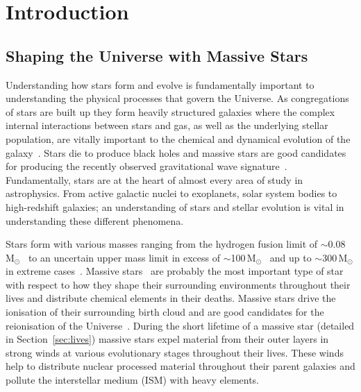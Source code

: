 \chapter{Introduction}\label{ch:intro}
\renewcommand{\headrulewidth}{1pt}

\section{Shaping the Universe with Massive Stars} %
\label{sec:massive_stars}
Understanding how stars form and evolve is fundamentally important to understanding the physical processes that govern the Universe.
As congregations of stars are built up they form heavily structured galaxies where the complex internal interactions between stars and gas, as well as the underlying stellar population, are vitally important to the chemical and dynamical evolution of the galaxy~\citep[e.g.][]{2014ARA&A..52..291C}.
Stars die to produce black holes and massive stars are good candidates for producing the recently observed gravitational wave signature~\citep{2016PhRvL.116f1102A,2016arXiv160204735L,2016arXiv160300511W}.
Fundamentally, stars are at the heart of almost every area of study in astrophysics.
From active galactic nuclei to exoplanets, solar system bodies to high-redshift galaxies; an understanding of stars and stellar evolution is vital in understanding these different phenomena.

Stars form with various masses ranging from the hydrogen fusion limit of $\sim$0.08\,M$_{\odot}$~\citep{1997ApJ...491..856B,2000ARA&A..38..337C} to an uncertain upper mass limit in excess of $\sim$100\,M$_{\odot}$~\citep[e.g.][]{2005Natur.434..192F,2012MNRAS.422..794E,2014A&A...568L..13W} and up to $\sim$300\,M$_{\odot}$ in extreme cases~\citep{2010MNRAS.408..731C}.
Massive stars~\citep[defined here as stars with initial masses $>$8\,M$_{\odot}$, e.g.][and expanded upon in Section~\ref{sec:lives}]{2014ARA&A..52..487S} are probably the most important type of star with respect to how they shape their surrounding environments throughout their lives and distribute chemical elements in their deaths.
Massive stars drive the ionisation of their surrounding birth cloud and are good candidates for the reionisation of the Universe~\citep[e.g.][]{1997ApJ...483...21H,2005SSRv..116..625C,2006ARA&A..44..415F}.
During the short lifetime of a massive star (detailed in Section~\ref{sec:lives}) massive stars expel material from their outer layers in strong winds at various evolutionary stages throughout their lives.
These winds help to distribute nuclear processed material throughout their parent galaxies and pollute the interstellar medium (ISM) with heavy elements.

